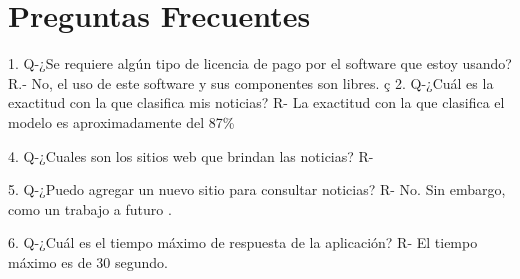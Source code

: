 \documentclass[12pt,twoside,onecolumn,openany]{article}
\begin{document}
\newpage
\newpage








\section{Preguntas Frecuentes}


1.	Q-¿Se requiere algún tipo de licencia de pago por el software que estoy usando?
R.- No, el uso de este software y sus componentes son libres.
ç
2.	Q-¿Cuál es la exactitud con la que clasifica mis noticias?
R- La exactitud con la que clasifica el modelo es aproximadamente del 87\%

4.	Q-¿Cuales son los sitios web que brindan las noticias?
R- 

5.	Q-¿Puedo agregar un nuevo sitio para consultar noticias?
R- No. Sin embargo, como un trabajo a futuro .

6.	Q-¿Cuál es el tiempo máximo de respuesta de la aplicación? 
R- El tiempo máximo es de 30 segundo.


	
\end{document}
